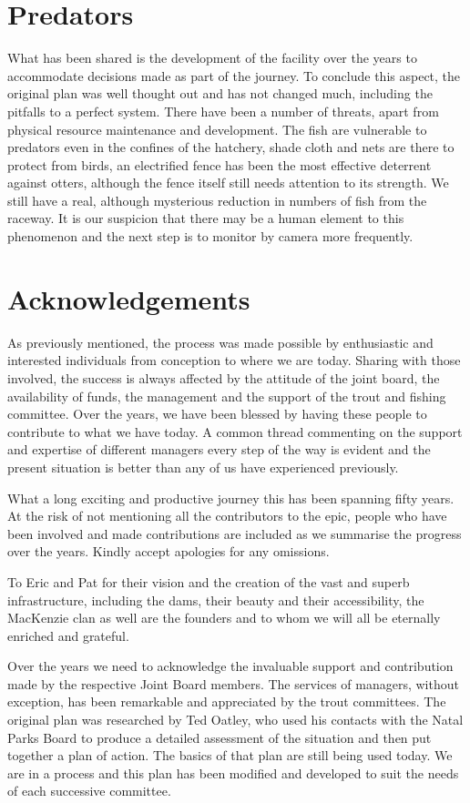 \section{Predators}
What has been shared is the development of the facility over the years to accommodate decisions made as part of the journey. 
To conclude this aspect, the original plan was well thought out and has not changed much, including the pitfalls to a perfect system. 
There have been a number of threats, apart from physical resource maintenance and development. 
The fish are vulnerable to predators even in the confines of the hatchery, shade cloth and nets are there to protect from birds, 
an electrified fence has been the most effective deterrent against otters, although the fence itself still needs attention to its strength. 
We still have a real, although mysterious reduction in numbers of fish from the raceway. It is our suspicion 
that there may be a human element to this phenomenon and the next step is to monitor by camera more frequently. 

\section{Acknowledgements}

As previously mentioned, the process was made possible by enthusiastic and interested individuals from conception 
to where we are today. Sharing with those involved, the success is always affected by the attitude of the joint board, 
the availability of funds, the management and the support of the trout and fishing committee. 
Over the years, we have been blessed by having these people to contribute to what we have today. 
A common thread commenting on the support and expertise of different managers every step of the way is 
evident and the present situation is better than any of us have experienced previously.

What a long exciting and productive journey this has been spanning fifty years. 
At the risk of not mentioning all the contributors to the epic, people who have been involved and made 
contributions are included as we summarise the progress over the years. Kindly accept apologies for any omissions. 

To Eric and Pat for their vision and the creation of the vast and superb infrastructure, including the dams, 
their beauty and their accessibility, the MacKenzie clan as well are the founders and to whom we will all be eternally enriched and grateful.

Over the years we need to acknowledge the invaluable support and contribution made by the respective Joint Board members. 
The services of managers, without exception, has been remarkable and appreciated by the trout committees. 
The original plan was researched by Ted Oatley, who used his contacts with the Natal Parks Board to produce a detailed assessment 
of the situation and then put together a plan of action. The basics of that plan are still being used today. 
We are in a process and this plan has been modified and developed to suit the needs of each successive committee.


